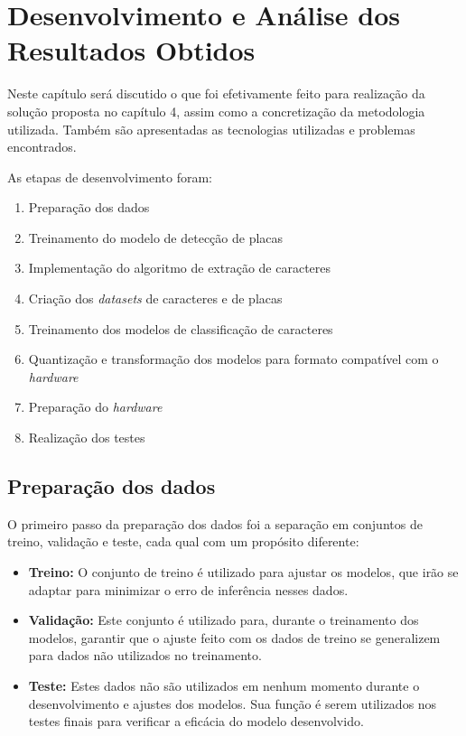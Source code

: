 \chapter{Desenvolvimento e Análise dos Resultados Obtidos}

Neste capítulo será discutido o que foi efetivamente feito para realização da solução proposta no capítulo 4, assim como a concretização da metodologia utilizada. Também são apresentadas as tecnologias utilizadas e problemas encontrados.

As etapas de desenvolvimento foram:
\begin{enumerate} 
\item Preparação dos dados 
\item Treinamento do modelo de detecção de placas 
\item Implementação do algoritmo de extração de caracteres 
\item Criação dos \textit{datasets} de caracteres e de placas 
\item Treinamento dos modelos de classificação de caracteres 
\item Quantização e transformação dos modelos para formato compatível com o \textit{hardware} 
\item Preparação do \textit{hardware} 
\item Realização dos testes 
\end{enumerate}

\section{Preparação dos dados}
O primeiro passo da preparação dos dados foi a separação em conjuntos de treino, validação e teste, cada qual com um propósito diferente:
\begin{itemize} 
\item \textbf{Treino:} O conjunto de treino é utilizado para ajustar os modelos, que irão se adaptar para minimizar o erro de inferência nesses dados. 
\item \textbf{Validação:} Este conjunto é utilizado para, durante o treinamento dos modelos, garantir que o ajuste feito com os dados de treino se generalizem para dados não utilizados no treinamento. 
\item \textbf{Teste:} Estes dados não são utilizados em nenhum momento durante o desenvolvimento e ajustes dos modelos. Sua função é serem utilizados nos testes finais para verificar a eficácia do modelo desenvolvido. 
\end{itemize}

